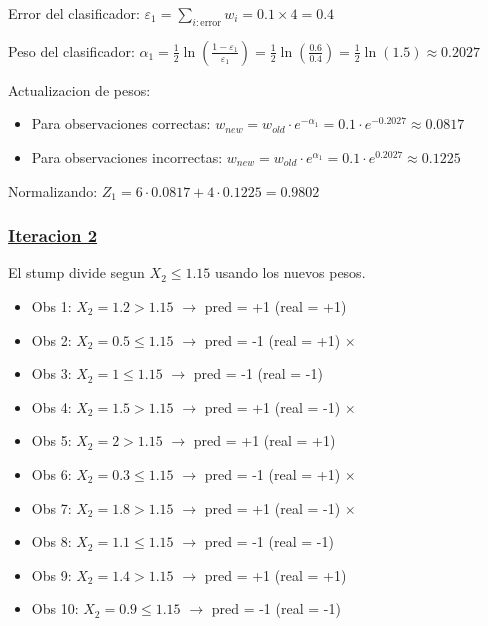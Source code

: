 \documentclass[12pt]{article}
\begin{document}
Error del clasificador: $\varepsilon_1 = \sum_{i: \text{error}} w_i = 0.1 \times 4 = 0.4$

\vspace{1em}

Peso del clasificador: $\alpha_1 = \frac{1}{2} \ln\left(\frac{1-\varepsilon_1}{\varepsilon_1}\right) = \frac{1}{2} \ln\left(\frac{0.6}{0.4}\right) = \frac{1}{2} \ln(1.5) \approx 0.2027$

\vspace{1em}

Actualizacion de pesos:
\begin{itemize}
    \item Para observaciones correctas: $w_{new} = w_{old} \cdot e^{-\alpha_1} = 0.1 \cdot e^{-0.2027} \approx 0.0817$
    \item Para observaciones incorrectas: $w_{new} = w_{old} \cdot e^{\alpha_1} = 0.1 \cdot e^{0.2027} \approx 0.1225$
\end{itemize}

Normalizando: $Z_1 = 6 \cdot 0.0817 + 4 \cdot 0.1225 = 0.9802$

\subsubsection*{\underline{Iteracion 2}}

El stump divide segun $X_2 \leq 1.15$ usando los nuevos pesos.

\begin{itemize}
    \item Obs 1: $X_2 = 1.2 > 1.15$ $\rightarrow$ pred = +1 (real = +1) \checkmark
    \item Obs 2: $X_2 = 0.5 \leq 1.15$ $\rightarrow$ pred = -1 (real = +1) $\times$
    \item Obs 3: $X_2 = 1 \leq 1.15$ $\rightarrow$ pred = -1 (real = -1) \checkmark
    \item Obs 4: $X_2 = 1.5 > 1.15$ $\rightarrow$ pred = +1 (real = -1) $\times$
    \item Obs 5: $X_2 = 2 > 1.15$ $\rightarrow$ pred = +1 (real = +1) \checkmark
    \item Obs 6: $X_2 = 0.3 \leq 1.15$ $\rightarrow$ pred = -1 (real = +1) $\times$
    \item Obs 7: $X_2 = 1.8 > 1.15$ $\rightarrow$ pred = +1 (real = -1) $\times$
    \item Obs 8: $X_2 = 1.1 \leq 1.15$ $\rightarrow$ pred = -1 (real = -1) \checkmark
    \item Obs 9: $X_2 = 1.4 > 1.15$ $\rightarrow$ pred = +1 (real = +1) \checkmark
    \item Obs 10: $X_2 = 0.9 \leq 1.15$ $\rightarrow$ pred = -1 (real = -1) \checkmark
\end{itemize}
\end{document}
